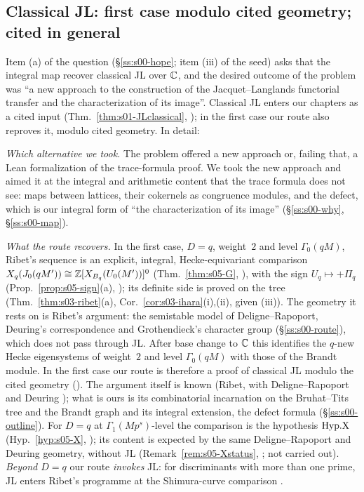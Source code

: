 \subsection{Classical JL: first case modulo cited geometry; cited in general}\label{ss:s00-whycited}
Item (a) of the question (\S\ref{ss:s00-hope}; item (iii) of the seed) asks that the integral map recover classical JL over $\mathbb{C}$, and
the desired outcome of the problem was ``a new approach to the construction of the Jacquet--Langlands functorial transfer and the
characterization of its image''. Classical JL enters our chapters as a cited input (Thm.~\ref{thm:s01-JLclassical}, \stcited); in
the first case our route also reproves it, modulo cited geometry. In detail:

\emph{Which alternative we took.} The problem offered a new approach or, failing that, a Lean formalization of the trace-formula
proof. We took the new approach and aimed it at the integral and arithmetic content that the trace formula does not see: maps
between lattices, their cokernels as congruence modules, and the defect, which is our integral form of ``the characterization of
its image'' (\S\ref{ss:s00-why}, \S\ref{ss:s00-map}).

\emph{What the route recovers.} In the first case, $D=q$, weight~$2$ and level $\Gamma_0(qM)$, Ribet's sequence is an explicit,
integral, Hecke-equivariant comparison $X_q(J_0(qM'))\cong\mathbb{Z}[X_{B_q}(U_0(M'))]^0$ (Thm.~\ref{thm:s05-G}, \stcited), with the sign
$U_q\mapsto+\Pi_q$ (Prop.~\ref{prop:s05-sign}(a), \stpmc); its definite side is proved on the tree (Thm.~\ref{thm:s03-ribet}(a),
Cor.~\ref{cor:s03-ihara}(i),(ii), \stproved{} given (iii)). The geometry it rests on is Ribet's argument: the semistable model of
Deligne--Rapoport, Deuring's correspondence and Grothendieck's character group (\S\ref{ss:s00-route}), which does not pass through
JL. After base change to $\mathbb{C}$ this identifies the $q$-new Hecke eigensystems of weight~$2$ and level $\Gamma_0(qM)$ with those of
the Brandt module. In the first case our route is therefore a proof of classical JL modulo the cited geometry
(). The argument itself is known (Ribet, with Deligne--Rapoport and Deuring \cite{Ri90});
what is ours is its combinatorial incarnation on the Bruhat--Tits tree and the Brandt graph and its integral extension, the
defect formula (\S\ref{ss:s00-outline}). For $D=q$ at $\Gamma_1(Mp^s)$-level the comparison is the hypothesis
$\mathrm{Hyp.X}$ (Hyp.~\ref{hyp:s05-X}, \sthyp); its content is expected by the same Deligne--Rapoport and Deuring geometry, without JL
(Remark~\ref{rem:s05-Xstatus}, \stexp; not carried out). \emph{Beyond $D=q$} our route \emph{invokes} JL: for discriminants with more
than one prime, JL enters Ribet's programme at the Shimura-curve comparison \cite[\S3.10.1]{RS}.

